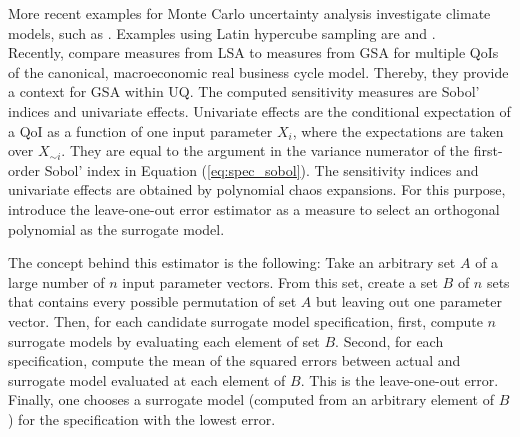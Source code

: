 \documentclass[a4paper,12pt]{article}
\begin{document}
\newline
More recent examples for Monte Carlo uncertainty analysis investigate climate models, such as \cite{Webster.2012}.
Examples using Latin hypercube sampling are \cite{Mattoo.2009} and \cite{Hope.2006}.\\
\newline
Recently, \cite{Harenberg.2019} compare measures from LSA to measures from GSA for multiple QoIs of the canonical, macroeconomic real business cycle model. Thereby, they provide a context for GSA within UQ. The computed sensitivity measures are Sobol' indices and univariate effects. Univariate effects are the conditional expectation of a QoI as a function of one input parameter $X_i$, where the expectations are taken over $X_{\sim i}$. They are equal to the argument in the variance numerator of the first-order Sobol' index in Equation (\ref{eq:spec_sobol}). The sensitivity indices and univariate effects are obtained by polynomial chaos expansions. For this purpose, \citeauthor{Harenberg.2019} introduce the leave-one-out error estimator as a measure to select an orthogonal polynomial as the surrogate model.

The concept behind this estimator is the following: Take an arbitrary set $A$ of a large number of $n$ input parameter vectors. From this set, create a set $B$ of $n$ sets that contains every possible permutation of set $A$ but leaving out one parameter vector. Then, for each candidate surrogate model specification, first, compute $n$ surrogate models by evaluating each element of set $B$. Second, for each specification, compute the mean of the squared errors between actual and surrogate model evaluated at each element of $B$. This is the leave-one-out error. Finally, one chooses a surrogate model (computed from an arbitrary element of $B$) for the specification with the lowest error.
\end{document}
